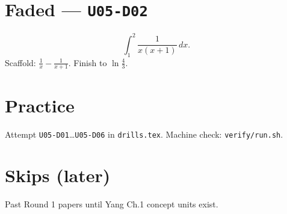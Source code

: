 \section{Faded --- \texttt{U05-D02}}
\[
\int_1^2\frac{1}{x(x+1)}\,dx.
\]
Scaffold: $\frac{1}{x}-\frac{1}{x+1}$. Finish to $\ln\frac43$.


\section{Practice}
Attempt \texttt{U05-D01}\ldots\texttt{U05-D06} in \texttt{drills.tex}.
Machine check: \texttt{verify/run.sh}.

\section{Skips (later)}
Past Round 1 papers until Yang Ch.1 concept units exist.

